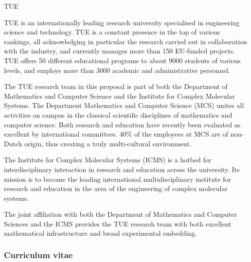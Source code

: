 \begin{sitedescription}{TUE}

TUE is an internationally leading research university specialised in engineering science and technology. TUE is a constant presence in the top of various rankings, all acknowledging in particular the research carried out in collaboration with the industry, and currently manages more than 150 EU-funded projects. TUE offers 50 different educational programs to about 9000 students of various levels, and employs more than 3000 academic and administrative personnel.

The TUE research team in this proposal is part of both the Department of Mathematics and Computer Science and the Institute for Complex Molecular Systems. 
The Department Mathematics and Computer Science (MCS) unites all activities on campus in the classical scientific disciplines of mathematics and computer science. Both research and education have recently been evaluated as excellent by international committees. 40\% of the employees at MCS are of non-Dutch origin, thus creating a truly multi-cultural environment. 

The Institute for Complex Molecular Systems (ICMS) is a hotbed for interdisciplinary interaction in research and education across the university. Its mission is to become the leading international multidisciplinary institute for research and education in the area of the engineering of complex molecular systems.

The joint affiliation with both the Department of Mathematics and Computer Sciences and the ICMS provides the TUE research team with both excellent mathematical infrastructure and broad experimental embedding.


\subsubsection*{Curriculum vitae}







\end{sitedescription}

